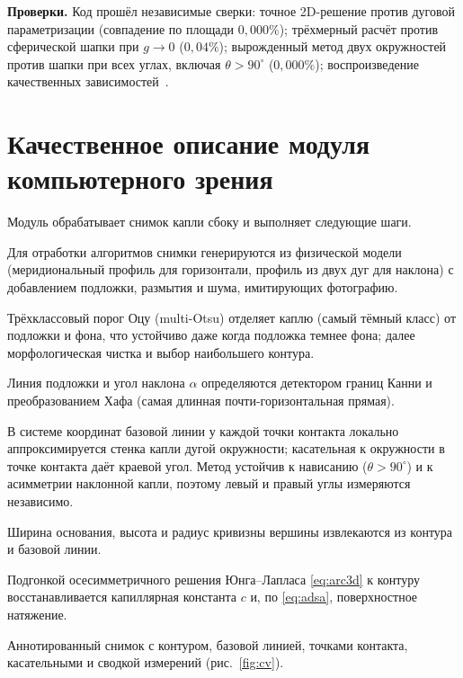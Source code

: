\documentclass[11pt]{article}
\theoremstyle{definition}
\begin{document}
\noindent\textbf{Проверки.} Код прошёл независимые сверки: точное 2D-решение против
дуговой параметризации (совпадение по площади $0{,}000\%$); трёхмерный расчёт против
сферической шапки при $g\to 0$ ($0{,}04\%$); вырожденный метод двух окружностей
против шапки при всех углах, включая $\theta>90^{\circ}$ ($0{,}000\%$);
воспроизведение качественных зависимостей~\cite{ElSherbini2004}.

\section{Качественное описание модуля компьютерного зрения}
\label{app:cv}
Модуль обрабатывает снимок капли сбоку и выполняет следующие шаги.

\begin{description}[leftmargin=1.3em,style=nextline]
\item[Подготовка снимка] Для отработки алгоритмов снимки генерируются из физической
модели (меридиональный профиль для горизонтали, профиль из двух дуг для наклона) с
добавлением подложки, размытия и шума, имитирующих фотографию.
\item[Выделение контура] Трёхклассовый порог Оцу (multi-Otsu) отделяет каплю (самый
тёмный класс) от подложки и фона, что устойчиво даже когда подложка темнее фона;
далее морфологическая чистка и выбор наибольшего контура.
\item[Базовая линия] Линия подложки и угол наклона $\alpha$ определяются детектором
границ Канни и преобразованием Хафа (самая длинная почти-горизонтальная прямая).
\item[Краевые углы] В системе координат базовой линии у каждой точки контакта
локально аппроксимируется стенка капли дугой окружности; касательная к окружности в
точке контакта даёт краевой угол. Метод устойчив к нависанию ($\theta>90^{\circ}$)
и к асимметрии наклонной капли, поэтому левый и правый углы измеряются независимо.
\item[Геометрия] Ширина основания, высота и радиус кривизны вершины извлекаются из
контура и базовой линии.
\item[ADSA] Подгонкой осесимметричного решения Юнга--Лапласа \eqref{eq:arc3d} к
контуру восстанавливается капиллярная константа $c$ и, по \eqref{eq:adsa},
поверхностное натяжение.
\item[Визуализация] Аннотированный снимок с контуром, базовой линией, точками
контакта, касательными и сводкой измерений (рис.~\ref{fig:cv}).
\end{description}
\end{document}
